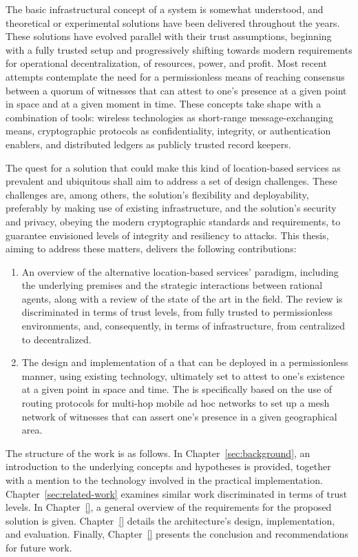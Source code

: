 The basic infrastructural concept of a \pol{} system is somewhat understood, and theoretical or experimental solutions have been delivered throughout the years. These solutions have evolved parallel with their trust assumptions, beginning with a fully trusted setup and progressively shifting towards modern requirements for operational decentralization, of resources, power, and profit. Most recent attempts contemplate the need for a permissionless means of reaching consensus between a quorum of witnesses that can attest to one's presence at a given point in space and at a given moment in time. These concepts take shape with a combination of tools: wireless technologies as short-range message-exchanging means, cryptographic protocols as confidentiality, integrity, or authentication enablers, and distributed ledgers as publicly trusted record keepers. 

The quest for a solution that could make this kind of location-based services as prevalent and ubiquitous shall aim to address a set of design challenges. These challenges are, among others, the solution's flexibility and deployability, preferably by making use of existing infrastructure, and the solution's security and privacy, obeying the modern cryptographic standards and requirements, to guarantee envisioned levels of integrity and resiliency to attacks. This thesis, aiming to address these matters, delivers the following contributions:
\begin{enumerate}
\item An overview of the alternative location-based services' paradigm, including the underlying premises and the strategic interactions between rational agents, along with a review of the state of the art in the field. The review is discriminated in terms of trust levels, from fully trusted to permissionless environments, and, consequently, in terms of infrastructure, from centralized to decentralized.
\item The design and implementation of a \poc{} that can be deployed in a permissionless manner, using existing technology, ultimately set to attest to one's existence at a given point in space and time. The \poc{} is specifically based on the use of routing protocols for multi-hop mobile ad hoc networks to set up a mesh network of witnesses that can assert one's presence in a given geographical area.
\end{enumerate}

The structure of the work is as follows. In Chapter~\ref{sec:background}, an introduction to the underlying concepts and hypotheses is provided, together with a mention to the technology involved in the practical implementation. Chapter~\ref{sec:related-work} examines similar work discriminated in terms of trust levels. In Chapter~\ref{}, a general overview of the requirements for the proposed solution is given. Chapter~\ref{} details the architecture's design, implementation, and evaluation. Finally, Chapter~\ref{} presents the conclusion and recommendations for future work.
